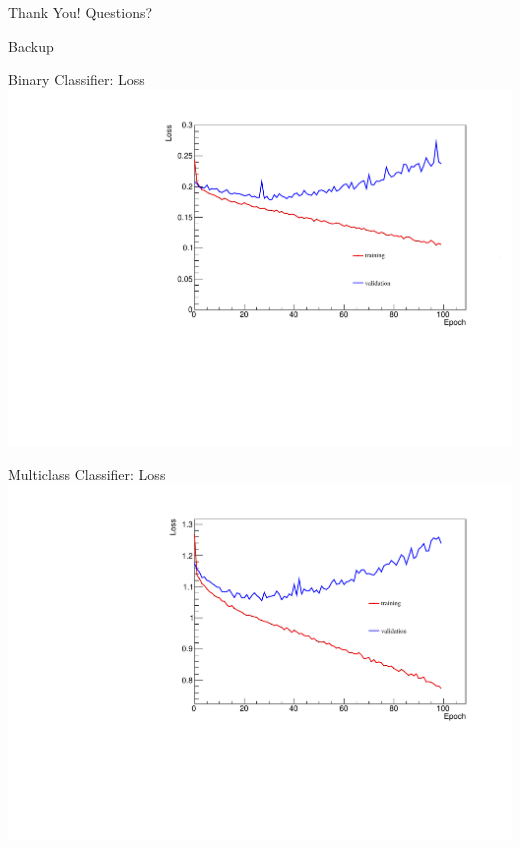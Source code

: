 \documentclass[10pt,handout]{beamer}
\begin{document}
\begin{frame}{Thank You!}
\centering
Questions?
\end{frame}

\begin{frame}{}
\centering
Backup
\end{frame}



\begin{frame}{Binary Classifier: Loss}
\centering
\includegraphics[scale=0.5]{binaryNetworkLoss.pdf}
\end{frame}



\begin{frame}{Multiclass Classifier: Loss}
\centering
\includegraphics[scale=0.5]{multiclassNetworkLoss.pdf}
\end{frame}
\end{document}

